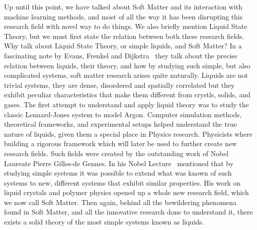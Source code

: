 Up until this point, we have talked about Soft Matter and its interaction with machine
learning methods, and most of all the way it has been disrupting this research field
with novel way to do things. We also briefly mention Liquid State Theory, but we must
first state the relation between both these research fields. Why talk about Liquid
State Theory, or simple liquids, and Soft Matter?
In a fascinating note by Evans, Frenkel and Dijkstra~\cite{evansSimpleLiquidsColloids2019}
they talk about the precise relation between liquids, their theory, and how by studying
such simple, but also complicated systems, soft matter research arises quite naturally.
Liquids are not trivial systems, they are dense, disordered and spatially correlated
but they exhibit peculiar characteristics that make them different from crystls, solids,
and gases. The first attempt to understand and apply liquid theory was to study the
classic Lennard-Jones system to model Argon. Computer simulation methods, theoretical
frameworks, and experimental setups helped understand the true nature of liquids,
given them a special place in Physics research. Physicists where building a rigorous
framework which will later be used to further create new research fields.
Such fields were created by the outstanding work of Nobel Laureate Pierre Gilles-de Gennes.
In his Nobel Lecture~\cite{degennesSoftMatter1992} mentioned that by studying simple systems
it was possible to extend what was known of such systems to new, different systems that
exhibit similar properties. His work on liquid crystals and polymer physics opened up
a whole new research field, which we now call Soft Matter. Then again, behind all the
bewildering phenomena found in Soft Matter, and all the innovative research done to 
understand it, there exists a solid theory of the most simple systems known as liquids.

